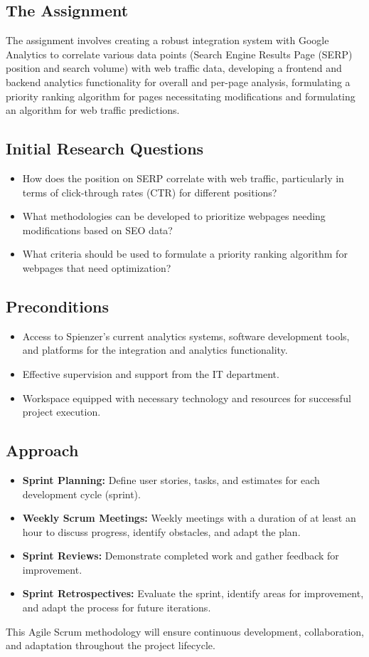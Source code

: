 \documentclass[12pt,a4paper]{article}
\begin{document}
\subsection{The Assignment}
The assignment involves creating a robust integration system with Google Analytics to correlate various data points (Search Engine Results Page (SERP) position and search volume) with web traffic data, developing a frontend and backend analytics functionality for overall and per-page analysis, formulating a priority ranking algorithm for pages necessitating modifications and formulating an algorithm for web traffic predictions.
\subsection{Initial Research Questions}
\begin{itemize}
    \item How does the position on SERP correlate with web traffic, particularly in terms of click-through rates (CTR) for different positions?
    \item What methodologies can be developed to prioritize webpages needing modifications based on SEO data?
    \item What criteria should be used to formulate a priority ranking algorithm for webpages that need optimization?
\end{itemize}
\subsection{Preconditions}
\begin{itemize}
    \item Access to Spienzer's current analytics systems, software development tools, and platforms for the integration and analytics functionality.
    \item Effective supervision and support from the IT department.
    \item Workspace equipped with necessary technology and resources for successful project execution.
\end{itemize}
\subsection{Approach}
\begin{itemize}
    \item \textbf{Sprint Planning:} Define user stories, tasks, and estimates for each development cycle (sprint).
    \item \textbf{Weekly Scrum Meetings:} Weekly meetings with a duration of at least an hour to discuss progress, identify obstacles, and adapt the plan.
    \item \textbf{Sprint Reviews:} Demonstrate completed work and gather feedback for improvement.
    \item \textbf{Sprint Retrospectives:} Evaluate the sprint, identify areas for improvement, and adapt the process for future iterations.
\end{itemize}
This Agile Scrum methodology will ensure continuous development, collaboration, and adaptation throughout the project lifecycle.
\end{document}

